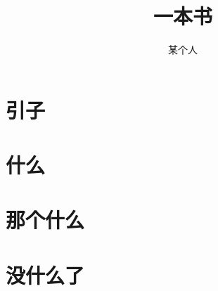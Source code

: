 \documentclass[UTF8]{ctexbook}
\title{一本书}
\author{某个人}
\date{\zhtoday}
\begin{document}
\frontmatter
\maketitle
\tableofcontents

\chapter{引子}
\zhlipsum

\mainmatter
\chapter{什么}
\zhlipsum

\chapter{那个什么}
\zhlipsum

\backmatter
\chapter{没什么了}
\zhlipsum
\end{document}
